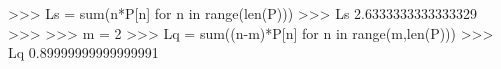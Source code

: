 
>>> Ls = sum(n*P[n] for n in range(len(P)))
>>> Ls
2.6333333333333329
>>>
>>> m = 2
>>> Lq = sum((n-m)*P[n] for n in range(m,len(P)))
>>> Lq
0.89999999999999991

